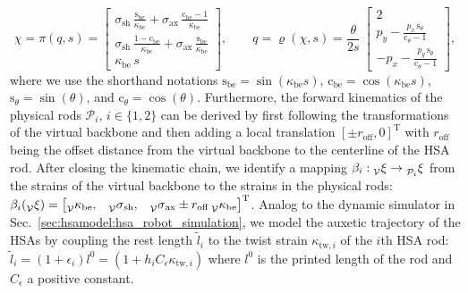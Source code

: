\begin{equation}\label{eq:hsamodel:planar_hsa_robot_model:kinematics}
    \chi = \pi(q, s) = \begin{bmatrix}
        \sigma_\mathrm{sh} \, \frac{\mathrm{s}_\mathrm{be}}{\kappa_\mathrm{be}} + \sigma_\mathrm{ax} \, \frac{\mathrm{c}_\mathrm{be}-1}{\kappa_\mathrm{be}}\\
        \sigma_\mathrm{sh} \, \frac{1-\mathrm{c}_\mathrm{be}}{\kappa_\mathrm{be}} + \sigma_\mathrm{ax} \, \frac{\mathrm{s}_\mathrm{be}}{\kappa_\mathrm{be}}\\
        \kappa_\mathrm{be} \, s
    \end{bmatrix},
    \qquad
    q = \varrho(\chi, s) 
    = \frac{\theta}{2s} \: \begin{bmatrix}
        2\\
        p_y - \frac{p_x \, \mathrm{s}_\theta}{\mathrm{c}_\theta-1}\\
        -p_x - \frac{p_y \, \mathrm{s}_\theta}{\mathrm{c}_\theta-1}
   \end{bmatrix},
\end{equation}
where we use the shorthand notations $\mathrm{s}_\mathrm{be} = \sin(\kappa_\mathrm{be}s)$, $\mathrm{c}_\mathrm{be} = \cos(\kappa_\mathrm{be}s)$, $\mathrm{s}_\theta = \sin(\theta)$, and $\mathrm{c}_\theta = \cos(\theta)$.
Furthermore, the forward kinematics of the physical rods $\mathcal{P}_i, \, i \in \{1, 2\}$ can be derived by first following the transformations of the virtual backbone and then adding a local translation $[\pm r_{\mathrm{off}},0]^\mathrm{T}$ with $r_\mathrm{off}$ being the offset distance from the virtual backbone to the centerline of the \gls{HSA} rod. 
After closing the kinematic chain, we identify a mapping $\beta_i: \prescript{}{\mathcal{V}}{\xi} \rightarrow \prescript{}{\mathcal{P}_i}{\xi}$ from the strains of the virtual backbone to the strains in the physical rods: $\beta_i(\prescript{}{\mathcal{V}}{\xi}) = \begin{bmatrix}
    \prescript{}{\mathcal{V}}{\kappa}_\mathrm{be}, & \prescript{}{\mathcal{V}}{\sigma}_\mathrm{sh}, & \prescript{}{\mathcal{V}}{\sigma}_\mathrm{ax} \pm r_{\mathrm{off}}  \prescript{}{\mathcal{V}}{\kappa}_\mathrm{be}
\end{bmatrix}^\mathrm{T}$.
% 
Analog to the dynamic simulator in Sec.~\ref{sec:hsamodel:hsa_robot_simulation}, we model the auxetic trajectory of the \glspl{HSA} by coupling the rest length $\tilde{l}_i$ to the twist strain $\kappa_{\mathrm{tw},i}$ of the $i$th \gls{HSA} rod: $\tilde{l}_i = (1 + \epsilon_i) l^0 = (1 + h_i C_\epsilon \kappa_{\mathrm{tw},i})$ where $l^0$ is the printed length of the rod and $C_\epsilon$ a positive constant.

